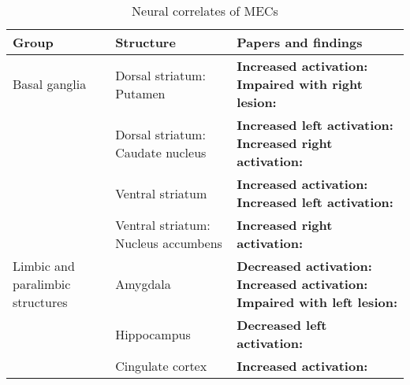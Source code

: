 \begin{table}[t!]
\centering
\scriptsize
\def\arraystretch{1.2}

\begin{threeparttable}
\caption{Neural correlates of MECs}
\label{tab:rev-4}

\begin{tabular*}{\textwidth}{
    >{\raggedright}p{}
    >{\raggedright}p{}
    >{\raggedright\arraybackslash}p{}}

\hline

\textbf{Group} & \textbf{Structure} & \textbf{Papers and findings} \\ 

\hline
Basal ganglia & Dorsal striatum: Putamen & 
    \textbf{Increased activation:} \textcite{klepzig2020} 
    \newline 
    \textbf{Impaired with right lesion:} \textcite{satoh2016} \\ 

\cline{2-3}   
& Dorsal striatum: Caudate nucleus & 
    \textbf{Increased left activation:} \textcite{klepzig2020} 
    \newline 
    \textbf{Increased right activation:} \textcite{salimpoor2011} \\

\cline{2-3}
& Ventral striatum & 
    \textbf{Increased activation:} \textcite{grunkina2017} 
    \newline 
    \textbf{Increased left activation:} \textcite{blood2001} \\
    
\cline{2-3}
& Ventral striatum: Nucleus accumbens & 
    \textbf{Increased right activation:} \textcite{salimpoor2011} \\

\hline
Limbic and paralimbic structures & Amygdala & 
    \textbf{Decreased activation:} \textcite{blood2001} 
    \newline 
    \textbf{Increased activation:} \textcite{grunkina2017} 
    \newline 
    \textbf{Impaired with left lesion:} \textcite{griffiths2004} \\

\cline{2-3}
& Hippocampus & 
    \textbf{Decreased left activation:} \textcite{blood2001} \\ 
    
\cline{2-3}
& Cingulate cortex & 
    \textbf{Increased activation:} \textcite{blood2001} \\
    

\end{tabular*}
\end{threeparttable}
\end{table}
